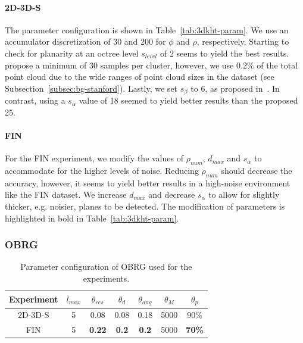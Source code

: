 \documentclass[main.tex]{subfiles}
\begin{document}
\paragraph{2D-3D-S}
The parameter configuration is shown in Table~\ref{tab:3dkht-param}. We use an accumulator discretization of 30 and 200 for $\phi$ and $\rho$, respectively.
Starting to check for planarity at an octree level $s_{level}$ of 2 seems to yield the best results.
\citeauthor{Limberger_Oliveira_2015}~\cite{Limberger_Oliveira_2015} propose
a minimum of 30 samples per cluster, however, we use $0.2\%$ of the total point cloud due to the wide ranges of point cloud sizes in the dataset (see Subsection~\ref{subsec:bg-stanford}).
Lastly, we set $s_\beta$ to 6, as proposed in~\cite[Section~3.1]{Limberger_Oliveira_2015}. In contrast, using a $s_\alpha$ value of 18 seemed to yield better results than the proposed 25.

\paragraph{FIN}
For the FIN experiment, we modify the values of $\rho_{num}$, $d_{max}$ and $s_\alpha$ to accommodate for the higher levels of noise.
Reducing $\rho_{num}$ should decrease the accuracy, however, it seems to yield better results in a high-noise environment like the FIN dataset.
We increase $d_{max}$ and decrease $s_\alpha$ to allow for slightly thicker, e.g. noisier, planes to be detected.
The modification of parameters is highlighted in bold in Table~\ref{tab:3dkht-param}.

\subsubsection{OBRG}
\begin{table}[H]
    \centering
    \begin{tabular}{c|cccccc}
        Experiment & $l_{max}$ & $\theta_{res}$ & $\theta_{d}$ & $\theta_{ang}$ & $\theta_M$ & $\theta_p$    \\ \hline
        2D-3D-S    & 5         & 0.08           & 0.08         & 0.18           & 5000       & 90\%          \\
        FIN        & 5         & \textbf{0.22}  & \textbf{0.2} & \textbf{0.2}   & 5000       & \textbf{70\%}
    \end{tabular}
    \caption{Parameter configuration of OBRG used for the experiments.}
    \label{tab:obrg-param}
\end{table}
\end{document}
